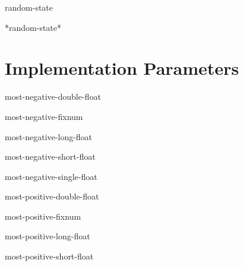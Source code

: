 \documentclass[10pt,english]{book}
\begin{document}
\begin{class}{random-state}{}
  
\end{class}

\begin{variable}{*random-state*}{}
  
\end{variable}

\section{Implementation Parameters}
\label{sec:impl-param}

\begin{constant}{most-negative-double-float}{}
  
\end{constant}

\begin{constant}{most-negative-fixnum}{}
  
\end{constant}

\begin{constant}{most-negative-long-float}{}
  
\end{constant}

\begin{constant}{most-negative-short-float}{}
  
\end{constant}

\begin{constant}{most-negative-single-float}{}
  
\end{constant}

\begin{constant}{most-positive-double-float}{}
  
\end{constant}

\begin{constant}{most-positive-fixnum}{}
  
\end{constant}

\begin{constant}{most-positive-long-float}{}
  
\end{constant}

\begin{constant}{most-positive-short-float}{}
  
\end{constant}
\end{document}
